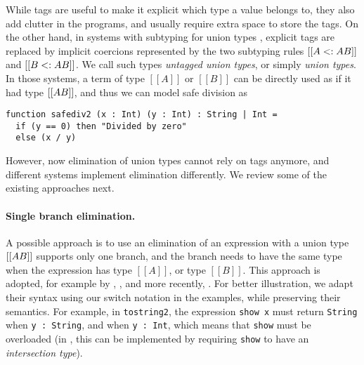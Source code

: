 


While tags are useful to make it explicit which type a value belongs to, they
also add clutter in the programs, and usually require extra space to store the
tags. On the other hand, in systems with subtyping for union types
\cite{dunfield2014elaborating,pierce1991programming,muehlboeck2018empowering},
explicit tags are replaced by implicit coercions represented by the two
subtyping rules $[[A <: A \/ B]]$ and $[[B <: A \/ B]]$. We call such types
\textit{untagged union types}, or simply \textit{union types}. In those systems,
a term of type $[[A]]$ or $[[B]]$ can be directly used as if it had type $[[A \/
B]]$, and thus we can model safe division as

\begin{lstlisting}
function safediv2 (x : Int) (y : Int) : String | Int =
  if (y == 0) then "Divided by zero"
  else (x / y)
\end{lstlisting}

\noindent However, now elimination of union types cannot rely on tags anymore, and
different systems implement elimination differently. We review some of the
existing approaches next.

\paragraph{Single branch elimination.}

A possible approach is to use an elimination of an expression with a union type
$[[A \/ B]]$ supports only one branch, and the branch needs to have the same
type when the expression has type $[[A]]$, or type $[[B]]$. This approach is
adopted, for example by \citet{pierce1991programming},
\citet{barbanera1995intersection}, and more recently,
\citet{dunfield2014elaborating}. For better illustration, we adapt their syntax
using our switch notation in the examples, while preserving their semantics. For
example, in \lstinline{tostring2}, the expression \lstinline{show x} must return
\lstinline{String} when \lstinline{y : String}, and when \lstinline{y : Int},
which means that \lstinline{show} must be overloaded (in
\citet{pierce1991programming,dunfield2014elaborating,barbanera1995intersection},
this can be implemented by requiring \lstinline{show} to have an
\textit{intersection type}).


